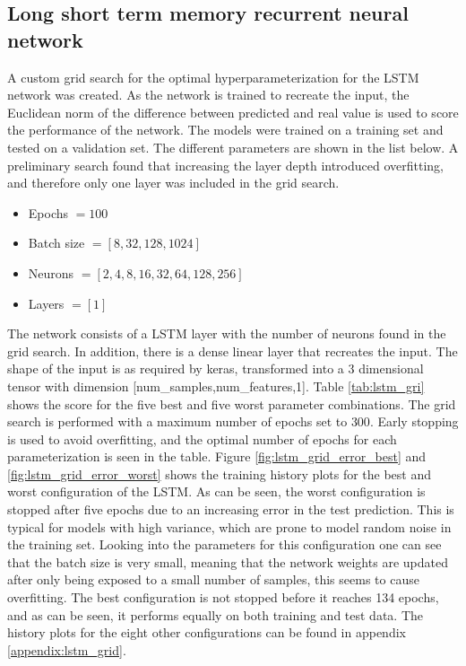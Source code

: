             \subsection{Long short term memory recurrent neural network}
                A custom grid search for the optimal hyperparameterization for the LSTM network was created. As the network is trained to recreate the input, the Euclidean norm of the difference between predicted and real value is used to score the performance of the network. The models were trained on a training set and tested on a validation set. The different parameters are shown in the list below. A preliminary search found that increasing the layer depth introduced overfitting, and therefore only one layer was included in the grid search.  
                \begin{itemize}
                    \item Epochs $= 100$
                    \item Batch size $=[8,32,128,1024]$
                    \item Neurons $= [2,4,8,16,32,64,128,256]$
                    \item Layers $= [1]$
                \end{itemize}
                The network consists of a LSTM layer with the number of neurons found in the grid search. In addition, there is a dense linear layer that recreates the input. The shape of the input is as required by keras, transformed into a 3 dimensional tensor with dimension [num\_samples,num\_features,1]. Table \ref{tab:lstm_gri} shows the score for the five best and five worst parameter combinations. The grid search is performed with a maximum number of epochs set to $300$. Early stopping is used to avoid overfitting, and the optimal number of epochs for each parameterization is seen in the table. Figure \ref{fig:lstm_grid_error_best} and \ref{fig:lstm_grid_error_worst} shows the training history plots for the best and worst configuration of the LSTM. As can be seen, the worst configuration is stopped after five epochs due to an increasing error in the test prediction. This is typical for models with high variance, which are prone to model random noise in the training set. Looking into the parameters for this configuration one can see that the batch size is very small, meaning that the network weights are updated after only being exposed to a small number of samples, this seems to cause overfitting. The best configuration is not stopped before it reaches 134 epochs, and as can be seen, it performs equally on both training and test data. The history plots for the eight other configurations can be found in appendix \ref{appendix:lstm_grid}. 
                
